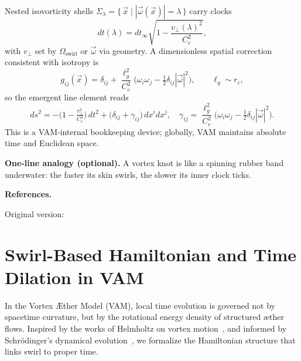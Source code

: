 \documentclass[12pt]{article}
\newcommand{\papername}{vam-swirl-time}
\newcommand{\Ce}{C_e}
\newcommand{\rc}{r_c}
\begin{document}
\begin{tcolorbox}[enhanced, breakable, sharp corners, colback=gray!2, colframe=black!40, title={Swirl-Based Hamiltonian, Time Dilation, and Emergent Geometry in VAM}]
        Nested isovorticity shells \(\Sigma_\lambda=\{\,\vec{x}\mid |\vec{\omega}(\vec{x})|=\lambda\,\}\) carry clocks
        \begin{equation}
            dt(\lambda)=dt_\infty\sqrt{1-\frac{v_\perp(\lambda)^2}{\Ce^2}},
        \end{equation}
        with \(v_\perp\) set by \(\Omega_{\text{swirl}}\) or \(\vec{\omega}\) via geometry. A dimensionless spatial correction consistent with isotropy is
        \begin{equation}
            g_{ij}(\vec{x})=\delta_{ij}+\frac{\ell_g^{2}}{\Ce^{2}}
            \Big(\omega_i\omega_j-\tfrac{1}{2}\delta_{ij}|\vec{\omega}|^{2}\Big),\qquad \ell_g\sim \rc,
            \label{eq:induced_metric}
        \end{equation}
        so the emergent line element reads
        \begin{equation}
            ds^{2}=-\Big(1-\tfrac{v_\perp^{2}}{\Ce^{2}}\Big)\,dt^{2}
            +\big(\delta_{ij}+\gamma_{ij}\big)\,dx^{i}dx^{j},\quad
            \gamma_{ij}=\frac{\ell_g^{2}}{\Ce^{2}}\Big(\omega_i\omega_j-\tfrac{1}{2}\delta_{ij}|\vec{\omega}|^{2}\Big).
        \end{equation}
        This is a VAM-internal bookkeeping device; globally, VAM maintains absolute time and Euclidean space.

        \medskip
        \noindent\textbf{One-line analogy (optional).} A vortex knot is like a spinning rubber band underwater: the faster its skin swirls, the slower its inner clock ticks.

        \medskip

        \noindent\textbf{References.} \
        
        

    \end{tcolorbox}


    Original version:




    \section{Swirl-Based Hamiltonian and Time Dilation in VAM}
    \label{sec:swirl_hamiltonian}

    In the Vortex \AE ther Model (VAM), local time evolution is governed not by spacetime curvature, but by the rotational energy density of structured æther flows. Inspired by the works of Helmholtz on vortex motion~\cite{Helmholtz1858}, and informed by Schrödinger's dynamical evolution~\cite{Schrodinger1926}, we formalize the Hamiltonian structure that links swirl to proper time.
\end{document}
